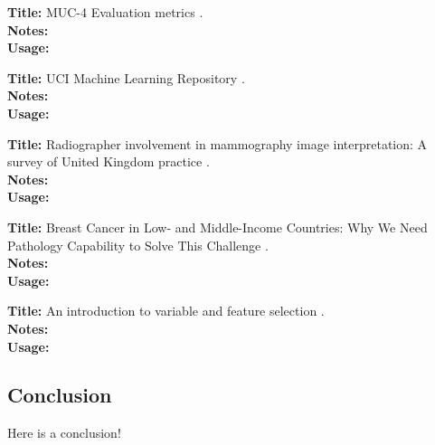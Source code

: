 \documentclass[a4paper]{article}
\begin{document}
\noindent
\textbf{Title:} MUC-4 Evaluation metrics \cite{muc1992}.
\\
\textbf{Notes:}
\\
\textbf{Usage:}
\\\par

\noindent
\textbf{Title:} {UCI} Machine Learning Repository \cite{dua:2017}.
\\
\textbf{Notes:}
\\
\textbf{Usage:}
\\\par

\noindent
\textbf{Title:} Radiographer involvement in mammography image interpretation: A survey of United Kingdom practice \cite{culpan2016}.
\\
\textbf{Notes:}
\\
\textbf{Usage:}
\\\par

\noindent
\textbf{Title:} Breast Cancer in Low- and Middle-Income Countries: Why We Need Pathology Capability to Solve This Challenge \cite{martei2018}.
\\
\textbf{Notes:}
\\
\textbf{Usage:}
\\\par

\noindent
\textbf{Title:} An introduction to variable and feature selection \cite{guyon2003}.
\\
\textbf{Notes:}
\\
\textbf{Usage:}
\\\par

\subsection{Conclusion}

Here is a conclusion!



\end{document}
